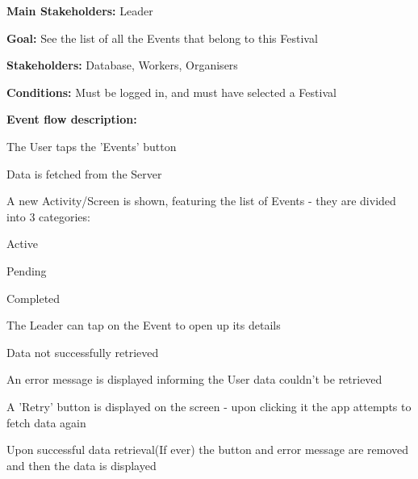 			\noindent {}
			\begin{packed_item}
				\item \textbf{Main Stakeholders:} Leader
				\item \textbf{Goal:} See the list of all the Events that belong to this Festival
				\item \textbf{Stakeholders: } Database, Workers, Organisers
				\item \textbf{Conditions: } Must be logged in, and must have selected a Festival
				\item \textbf{Event flow description: }
				\begin{packed_enum}
					\item The User taps the 'Events' button
					\item Data is fetched from the Server
					\item A new Activity/Screen is shown, featuring the list of Events - they are divided into 3 categories:
					\item[] \begin{packed_enum}
						\item Active
						\item Pending
						\item Completed
					\end{packed_enum}
					\item The Leader can tap on the Event to open up its details
				\end{packed_enum}
				
				\begin{packed_item}
					\item[1.a, 4.a] Data not successfully retrieved
					\item[] \begin{packed_enum}
						\item An error message is displayed informing the User data couldn't be retrieved
						\item A 'Retry' button is displayed on the screen - upon clicking it the app attempts to fetch data again
						\item Upon successful data retrieval(If ever) the button and error message are removed and then the data is displayed
					\end{packed_enum}	
				\end{packed_item}
			\end{packed_item}		
			
